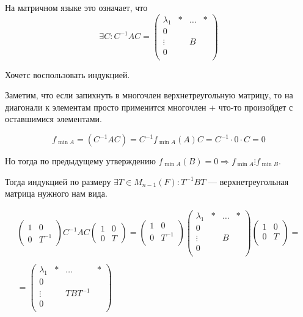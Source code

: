 На матричном языке это означает, что
\[
    \exists C : C^{-1} A C
    =
    \begin{pmatrix}
        \lambda_1 & * & \ldots & *
        \\
        0 & \ & \ & \
        \\
        \vdots & \ & B & \
        \\
        0 & \ & \ & \
        \\
    \end{pmatrix}
\]

Хочетс воспользовать индукцией.

Заметим, что если запихнуть в многочлен верхнетреугольную матрицу,
то на диагонали к элементам просто применится многочлен + что-то произойдет с оставшимися элементами.

\[
    f_{\min A} = (C^{-1} A C) = C^{-1} f_{\min A} (A) C = C^{-1} \cdot 0 \cdot C = 0
\]

Но тогда по предыдущему утверждению \( f_{\min A} (B) = 0 \Rightarrow f_{\min A} \vdots f_{\min B} \).

Тогда индукцией по размеру \( \exists T \in M_{n - 1} (F) : T^{-1} B T \) --- верхнетреугольная матрица нужного нам вида.

\begin{gather*}
    \begin{pmatrix}
        1 & 0 \\
        0 & T^{-1}
    \end{pmatrix}
    C^{-1}
    A
    C
    \begin{pmatrix}
        1 & 0 \\
        0 & T
    \end{pmatrix}
    =
    \begin{pmatrix}
        1 & 0
        \\
        0 & T^{-1}
        \\
    \end{pmatrix}
    \begin{pmatrix}
        \lambda_1 & * & \ldots & *
        \\
        0 & \ & \ & \
        \\
        \vdots & \ & B & \
        \\
        0 & \ & \ & \
        \\
    \end{pmatrix}
    \begin{pmatrix}
        1 & 0
        \\
        0 & T
        \\
    \end{pmatrix}
    =
    \\
    \\
    =
    \begin{pmatrix}
        \lambda_1 & * & \ldots & *
        \\
        0 & \ & \ & \
        \\
        \vdots & \ & T B T^{-1} & \
        \\
        0 & \ & \ & \
        \\
    \end{pmatrix}
\end{gather*}

